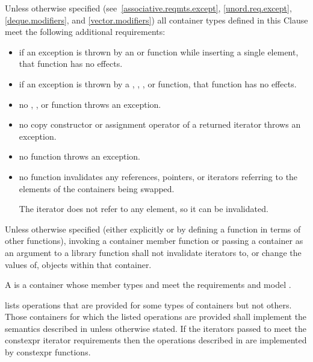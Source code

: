 \pnum
Unless otherwise specified (see~\ref{associative.reqmts.except}, \ref{unord.req.except}, \ref{deque.modifiers}, and
\ref{vector.modifiers})
all container types defined in this Clause meet
the following additional requirements:
\begin{itemize}
\item
if an exception is thrown by an
 or 
function while inserting a single element, that
function has no effects.
\item
if an exception is thrown by a
,
,
, or 
function, that function has no effects.
\item
no
,
,
or
function throws an exception.
\item
no copy constructor or assignment operator of a returned iterator
throws an exception.
\item
no
function throws an exception.
\item
no
function invalidates any references,
pointers, or iterators referring to the elements
of the containers being swapped.
\begin{note}
The  iterator does not refer to any element, so it can be invalidated.
\end{note}
\end{itemize}

\pnum
Unless otherwise specified (either explicitly or by defining a
function in terms of other functions), invoking a container member
function or passing a container as an argument to a library function
shall not invalidate iterators to, or change the values of, objects
within that container.

\pnum
A 
is a container
whose member types  and 
meet the
 requirements and
model .

\pnum
{} lists operations that are provided
for some types of containers but not others. Those containers for which the
listed operations are provided shall implement the semantics described in
 unless otherwise stated.
If the iterators passed to 
meet the constexpr iterator requirements
then the operations described in 
are implemented by constexpr functions.


